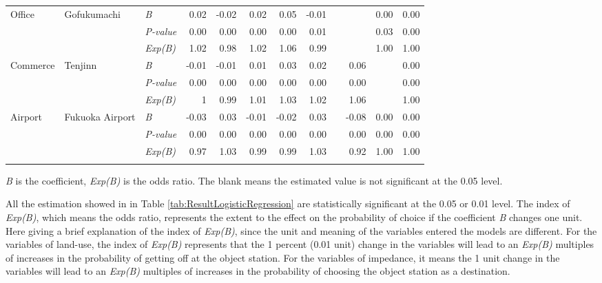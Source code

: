 \documentclass[utf8]{article}
\begin{document}
\begin{table}
\begin{tabular}{p{7em}p{5em}p{5em}<{\centering}rrrrrrrrr}
		\multirow{3}[0]{7em}{Office} & \multirow{3}[0]{5em}{Gofukumachi} & \textsl{B} & 0.02 & -0.02 & 0.02 & 0.05 & -0.01 & & & 0.00 & 0.00 \\
		& & \textsl{P-value} & 0.00 & 0.00 & 0.00 & 0.00 & 0.01 & & & 0.03 & 0.00 \\
		& & \textsl{Exp(B)} & 1.02 & 0.98 & 1.02 & 1.06 & 0.99 & & & 1.00 & 1.00 \\
		\midrule
		
		\multirow{3}[0]{7em}{Commerce} & \multirow{3}[0]{5em}{Tenjinn} & \textsl{B} & -0.01 & -0.01 & 0.01  & 0.03  & 0.02  & & 0.06 & & 0.00 \\
		& & \textsl{P-value} & 0.00 & 0.00 & 0.00 & 0.00  & 0.00 & & 0.00 & & 0.00 \\
		& & \textsl{Exp(B)} & 1 & 0.99 & 1.01 & 1.03 & 1.02 & & 1.06 & & 1.00 \\
		\midrule
		
		\multirow{3}[0]{7em}{Airport} & \multirow{3}[0]{5em}{Fukuoka Airport} & \textsl{B} & -0.03 & 0.03 & -0.01 & -0.02 & 0.03 & & -0.08 & 0.00 & 0.00 \\
		& & \textsl{P-value} & 0.00 & 0.00 & 0.00 & 0.00 & 0.00 & & 0.00 & 0.00 & 0.00 \\
		& & \textsl{Exp(B)} & 0.97 & 1.03 & 0.99 & 0.99 & 1.03 & & 0.92 & 1.00 & 1.00 \\
		\Xhline{1.5pt}
		
	\end{tabular}%
	\begin{description}
		\label{note:tab:Result}
		\item[*Note:] \textsl{B} is the coefficient, \textsl{Exp(B)} is the odds ratio. The blank means the estimated value is not significant at the 0.05 level.
	\end{description}

\end{table}%

%
All the estimation showed in in Table \ref{tab:ResultLogisticRegression} are statistically significant at the 0.05 or 0.01 level. The index of \textsl{Exp(B)}, which means the odds ratio, represents the extent to the effect on the probability of choice if the coefficient \textsl{B} changes one unit. Here giving a brief explanation of the index of \textsl{Exp(B)}, since the unit and meaning of the variables entered the models are different. For the variables of land-use, the index of \textsl{Exp(B)} represents that the 1 percent (0.01 unit) change in the variables will lead to an \textsl{Exp(B)} multiples of increases in the probability of getting off at the object station. For the variables of impedance, it means the 1 unit change in the variables will lead to an \textsl{Exp(B)} multiples of increases in the probability of choosing the object station as a destination. 
\end{document}
